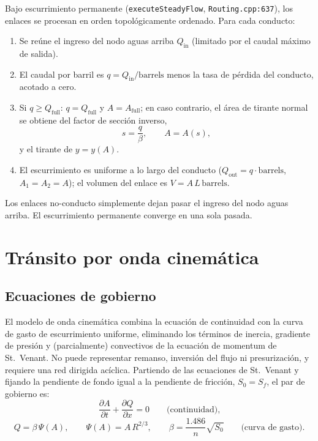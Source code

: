 \documentclass[11pt,a4paper]{article}
\begin{document}
Bajo escurrimiento permanente (\texttt{executeSteadyFlow},
\texttt{Routing.cpp:637}), los enlaces se procesan en orden topológicamente
ordenado. Para cada conducto:
\begin{enumerate}[nosep]
  \item Se reúne el ingreso del nodo aguas arriba $Q_{\mathrm{in}}$ (limitado
        por el caudal máximo de salida).
  \item El caudal por barril es $q = Q_{\mathrm{in}}/\mathrm{barrels}$ menos la
        tasa de pérdida del conducto, acotado a cero.
  \item Si $q \ge Q_{\mathrm{full}}$: $q = Q_{\mathrm{full}}$ y
        $A = A_{\mathrm{full}}$; en caso contrario, el área de tirante normal
        se obtiene del factor de sección inverso,
        \begin{equation}
          s = \frac{q}{\beta}, \qquad A = A(s),
        \end{equation}
        y el tirante de $y = y(A)$.
  \item El escurrimiento es uniforme a lo largo del conducto ($Q_{\mathrm{out}}
        = q\cdot\mathrm{barrels}$, $A_1 = A_2 = A$); el volumen del enlace es
        $V = A\,L\,\mathrm{barrels}$.
\end{enumerate}
Los enlaces no-conducto simplemente dejan pasar el ingreso del nodo aguas
arriba. El escurrimiento permanente converge en una sola pasada.

\section{Tránsito por onda cinemática}

\subsection{Ecuaciones de gobierno}

El modelo de onda cinemática combina la ecuación de continuidad con la curva
de gasto de escurrimiento uniforme, eliminando los términos de inercia,
gradiente de presión y (parcialmente) convectivos de la ecuación de momentum de
St.\ Venant. No puede representar remanso, inversión del flujo ni
presurización, y requiere una red dirigida acíclica. Partiendo de las
ecuaciones de St.\ Venant y fijando la pendiente de fondo igual a la pendiente
de fricción, $S_0 = S_f$, el par de gobierno es:
\begin{equation}
  \frac{\partial A}{\partial t} + \frac{\partial Q}{\partial x} = 0
  \qquad\text{(continuidad),}
\end{equation}
\begin{equation}
  Q = \beta\,\Psi(A), \qquad \Psi(A) = A\,R^{2/3},
  \qquad \beta = \frac{1.486}{n}\sqrt{S_0}
  \qquad\text{(curva de gasto).}
\end{equation}
\end{document}
